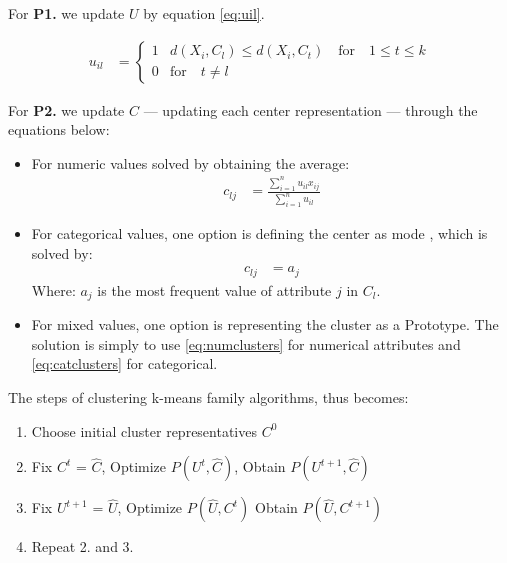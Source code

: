 \documentclass[../report.tex]{subfiles}
\begin{document}
For \textbf{P1.} we update $U$ by equation \ref{eq:uil}.

\begin{align}
 \label{eq:uil}
  u_{il} &= 
  \begin{cases}
  1 & d(X_i,C_l) \leq d(X_i,C_t) \quad \text{for} \quad 1 \leq t \leq k \\
  0 & \text{for} \quad t \neq l
  \end{cases}
\end{align}

For \textbf{P2.} we update $C$ --- updating each center representation --- through the equations below:

\begin{itemize}
    \item For numeric values solved by obtaining the average:
      \begin{align}
        \label{eq:numclusters}
        c_{lj} &= \frac{ \sum_{i = 1}^{n}{ u_{ il }x_{ ij }  }}{\sum_{i = 1}^{n}{ u_{ il }}}
      \end{align}
    \item For categorical values, one option is defining the center as mode \cite{Ng1999}, which is solved by:
      \begin{align}
        \label{eq:catclusters}
      c_{lj} &= a_{j}
      \end{align}
      Where: $a_{j}$ is the most frequent value of attribute $j$ in $C_l$.
    \item For mixed values, one option is representing the cluster as a Prototype\cite{Huang97clusteringlarge,Huang1998}. The solution is simply to use \ref{eq:numclusters} for numerical attributes and \ref{eq:catclusters} for categorical.
\end{itemize}

The steps of clustering k-means family algorithms, thus becomes:

\begin{enumerate}
  \item Choose initial cluster representatives $C^0$
  \item Fix $C^t$ = $\hat{C}$, Optimize $P(U^{t}, \hat{ C })$, Obtain $P(U^{t + 1}, \hat{ C })$
  \item Fix $U^{t + 1}$ = $\hat{U}$, Optimize $P(\hat{U}, C^t)$ Obtain $P(\hat{ U }, C^{t + 1})$
  \item Repeat 2. and 3.
\end{enumerate}
\end{document}
